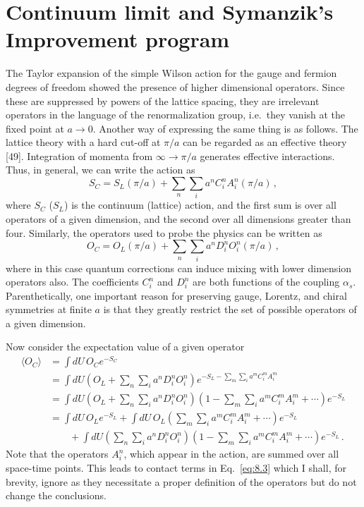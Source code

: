 \chapter{Continuum limit and Symanzik's Improvement program}

The Taylor expansion of the simple Wilson action for the gauge and fermion
degrees of freedom showed the presence of higher dimensional operators.
Since these are suppressed by powers of the lattice spacing, they are
irrelevant operators in the language of the renormalization group, i.e.\ they
vanish at the fixed point at $a \to 0$. Another way of expressing the same
thing is as follows. The lattice theory with a hard cut-off at $\pi/a$ can be
regarded as an effective theory [49]. Integration of momenta from
$\infty \to \pi/a$ generates effective interactions. Thus, in general, we can
write the action as
\begin{equation}
S_C = S_L(\pi/a) + \sum_n \sum_i a^n C_i^n A_i^n(\pi/a) \,,
\label{eq:8.1}
\end{equation}
where $S_C$ ($S_L$) is the continuum (lattice) action, and the first sum is
over all operators of a given dimension, and the second over all dimensions
greater than four. Similarly, the operators used to probe the physics can be
written as
\begin{equation}
O_C = O_L(\pi/a) + \sum_n \sum_i a^n D_i^n O_i^n(\pi/a) \,,
\label{eq:8.2}
\end{equation}
where in this case quantum corrections can induce mixing with lower dimension
operators also. The coefficients $C_i^n$ and $D_i^n$ are both functions of the
coupling $\alpha_s$. Parenthetically, one important reason for preserving
gauge, Lorentz, and chiral symmetries at finite $a$ is that they greatly
restrict the set of possible operators of a given dimension.

Now consider the expectation value of a given operator
\begin{equation}
\begin{split}
\langle O_C \rangle &= \int dU\, O_C e^{-S_C} \\
&= \int dU \left( O_L + \sum_n \sum_i a^n D_i^n O_i^n \right)
   e^{-S_L - \sum_m \sum_i a^m C_i^m A_i^m} \\
&= \int dU \left( O_L + \sum_n \sum_i a^n D_i^n O_i^n \right)
   \left( 1 - \sum_m \sum_i a^m C_i^m A_i^m + \cdots \right) e^{-S_L} \\
&= \int dU\, O_L e^{-S_L}
   + \int dU\, O_L \left( \sum_m \sum_i a^m C_i^m A_i^m + \cdots \right) e^{-S_L} \\
&\qquad + \int dU \left( \sum_n \sum_i a^n D_i^n O_i^n \right)
   \left( 1 - \sum_m \sum_i a^m C_i^m A_i^m + \cdots \right) e^{-S_L} \,.
\end{split}
\label{eq:8.3}
\end{equation}
Note that the operators $A_i^n$, which appear in the action, are summed over
all space-time points. This leads to contact terms in Eq.~\ref{eq:8.3} which
I shall, for brevity, ignore as they necessitate a proper definition of the
operators but do not change the conclusions.

